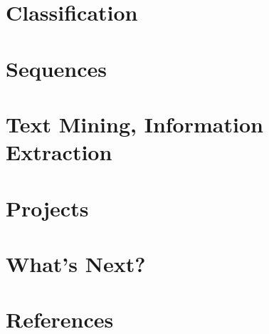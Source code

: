 \section[Class]{Classification}


\section[Seq]{Sequences}



\section[IR]{Text Mining, Information Extraction}
 


\section[Prj]{Projects}
%  

\section[Next]{What's Next?}



\section[Refs]{References}


